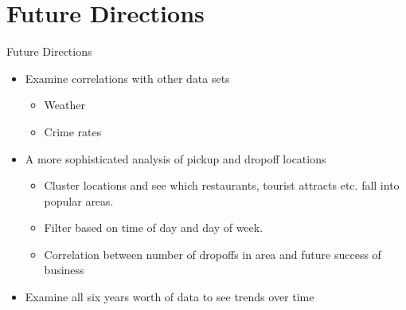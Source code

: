 \documentclass[11pt,tightenlines,nofootinbib,superscriptaddress,notitlepage, APS, pra]{beamer}
\theoremstyle{definition}
\theoremstyle{plain}
\begin{document}
\section{Future Directions}
\begin{frame}{Future Directions}
\begin{itemize}
\item Examine correlations with other data sets
\begin{itemize}
\item Weather
\item Crime rates
\end{itemize}
\item A more sophisticated analysis of pickup and dropoff locations
\begin{itemize}
\item Cluster locations and see which restaurants, tourist attracts etc. fall into popular areas.
\item Filter based on time of day and day of week.
\item Correlation between number of dropoffs in area and future success of business 
\end{itemize}
\item Examine all six years worth of data to see trends over time
\end{itemize}
\end{frame}
\end{document}
